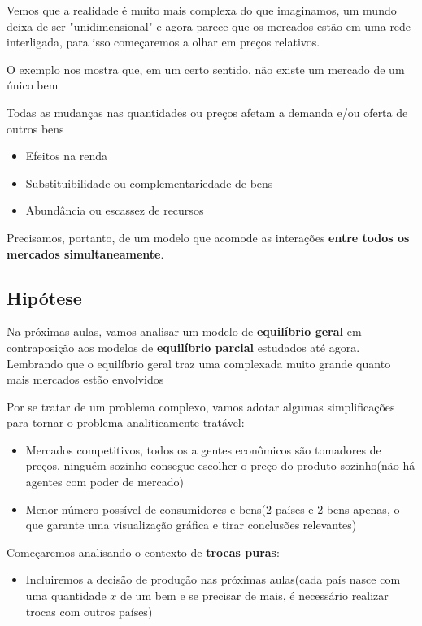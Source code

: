 \documentclass[a4paper,12pt]{article}[abntex2]
\begin{document}
Vemos que a realidade é muito mais complexa do que imaginamos, um mundo deixa de ser "unidimensional" e agora parece que os mercados estão em uma rede interligada, para isso começaremos a olhar em preços relativos.

O exemplo nos mostra que, em um certo sentido, não existe um mercado de um único bem

Todas as mudanças nas quantidades ou preços afetam a demanda e/ou oferta de outros bens\begin{itemize}
    \item Efeitos na renda
    \item Substituibilidade ou complementariedade de bens
    \item Abundância ou escassez de recursos
\end{itemize}

Precisamos, portanto, de um modelo que acomode as interações \textbf{entre todos os mercados simultaneamente}.

\subsection{\textbf{Hipótese}}

Na próximas aulas, vamos analisar um modelo de \textbf{equilíbrio geral} em contraposição aos modelos de \textbf{equilíbrio parcial} estudados até agora. Lembrando que o equilíbrio geral traz uma complexada muito grande quanto mais mercados estão envolvidos

Por se tratar de um problema complexo, vamos adotar algumas simplificações para tornar o problema analiticamente tratável:
\begin{itemize}
    \item Mercados competitivos, todos os a gentes econômicos são tomadores de preços, ninguém sozinho consegue escolher o preço do produto sozinho(não há agentes com poder de mercado)
    \item Menor número possível de consumidores e bens(2 países e 2 bens apenas, o que garante uma visualização gráfica e tirar conclusões relevantes)
\end{itemize}

Começaremos analisando o contexto de \textbf{trocas puras}:
\begin{itemize}
    \item Incluiremos a decisão de produção nas próximas aulas(cada país nasce com uma quantidade $x$ de um bem e se precisar de mais, é necessário realizar trocas com outros países)
\end{itemize}
\end{document}
